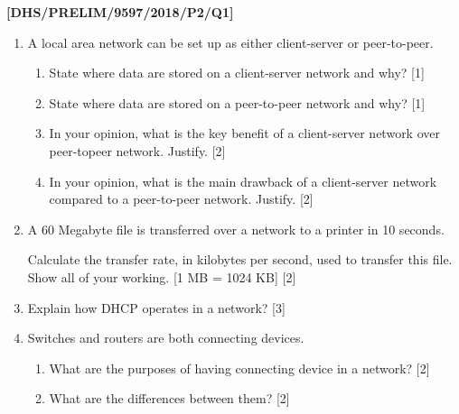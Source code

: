 \item \textbf{{[}DHS/PRELIM/9597/2018/P2/Q1{]} }
\begin{enumerate}
\item A local area network can be set up as either client-server or peer-to-peer.
\begin{enumerate}
\item State where data are stored on a client-server network and why? \hfill{}{[}1{]}
\item State where data are stored on a peer-to-peer network and why? \hfill{}{[}1{]}
\item In your opinion, what is the key benefit of a client-server network
over peer-topeer network. Justify. \hfill{}{[}2{]}
\item In your opinion, what is the main drawback of a client-server network
compared to a peer-to-peer network. Justify. \hfill{}{[}2{]}
\end{enumerate}
\item A 60 Megabyte file is transferred over a network to a printer in 10
seconds. 

Calculate the transfer rate, in kilobytes per second, used to transfer
this file. Show all of your working. {[}1 MB = 1024 KB{]} \hfill{}{[}2{]}
\item Explain how DHCP operates in a network? \hfill{}{[}3{]}
\item Switches and routers are both connecting devices.
\begin{enumerate}
\item What are the purposes of having connecting device in a network?\hfill{}
{[}2{]}
\item What are the differences between them?\hfill{} {[}2{]}
\end{enumerate}
\end{enumerate}